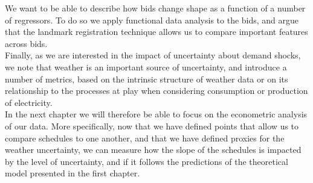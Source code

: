 We want to be able to describe how bids change shape as a function of a number of regressors. To do so we apply functional data analysis to the bids, and argue that the landmark registration technique allows us to compare important features across bids. \\

Finally, as we are interested in the impact of uncertainty about demand shocks, we note that weather is an important source of uncertainty, and introduce a number of metrics, based on the intrinsic structure of weather data or on its relationship to the processes at play when considering consumption or production of electricity. \\

In the next chapter we will therefore be able to focus on the econometric analysis of our data. More specifically, now that we have defined points that allow us to compare schedules to one another, and that we have defined proxies for the weather uncertainty, we can measure how the slope of the schedules is impacted by the level of uncertainty, and if it follows the predictions of the theoretical model presented in the first chapter.

